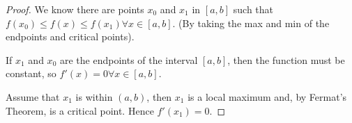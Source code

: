 \documentclass[a4paper,10pt]{article}
\begin{document}
\begin{proof}
	We know there are points $x_0$ and $x_1$ in $[a,b]$ such that
	$f(x_0) \leq f(x) \leq f(x_1) \forall x \in [a,b]$. (By taking
	the max and min of the endpoints and critical points).

	If $x_1$ and $x_0$ are the endpoints of the interval $[a,b]$,
	then the function must be constant, so $f'(x) = 0 \forall x \in
	[a,b]$.

	Assume that $x_1$ is within $(a,b)$, then $x_1$ is a local
	maximum and, by Fermat's Theorem, is a critical point. Hence
	$f'(x_1) = 0$.
\end{proof}
\end{document}

